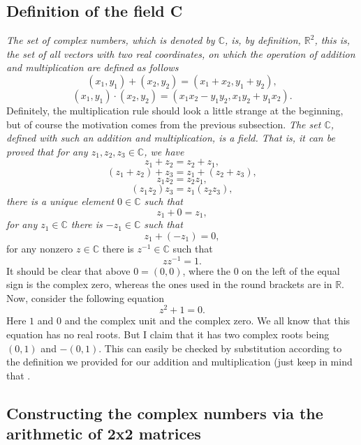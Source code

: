 \documentclass[12pt,oneside,openany]{memoir}
\numberwithin{equation}{subsection}
\begin{document}

\subsection{Definition of the field C}
\textit{The set of complex numbers, which is denoted by $\mathbb{C}$, is, by
definition, $\mathbb{R}^2$, this is, the set of all vectors with two real
coordinates, on which the operation of addition and multiplication are defined
as follows}
\[
	(x_1, y_1) + (x_2, y_2) = (x_1 + x_2, y_1 + y_2),
\]
\[
	(x_1, y_1) \cdot (x_2, y_2) = (x_1 x_2 - y_1 y_2, x_1 y_2 + y_1 x_2).
\]
Definitely, the multiplication rule should look a little strange at the
beginning, but of course the motivation comes from the previous subsection.
\bigbreak\noindent
\textit{The set $\mathbb{C}$, defined with such an addition and multiplication,
is a field. That is, it can be proved that for any
$z_1, z_2, z_3 \in \mathbb{C}$, we have}
\[
	z_1 + z_2 = z_2 + z_1,
\]
\[
	(z_1 + z_2) + z_3 = z_1 + (z_2 + z_3),
\]
\[
	z_1 z_2 = z_2 z_1,
\]
\[
	(z_1 z_2) z_3 = z_1 (z_2 z_3),
\]
\textit{there is a unique element $0 \in \mathbb{C}$ such that}
\[
	z_1 + 0 = z_1,
\]
\textit{for any $z_1 \in \mathbb{C}$ there is $-z_1 \in \mathbb{C}$ such that}
\[
	z_1 + (-z_1) = 0,
\]
for any nonzero $z \in \mathbb{C}$ there is $z^{-1} \in \mathbb{C}$ such that
\[
	z z^{-1} = 1.
\]
It should be clear that above $0 = (0, 0)$, where the $0$ on the left of the
equal sign is the complex zero, whereas the ones used in the round brackets are
in $\mathbb{R}$.
\bigbreak
Now, consider the following equation
\[
	z^2 + 1 = 0.
\]
Here $1$ and $0$ and the complex unit and the complex zero. We all know  that
this equation has  no real roots. But I claim that it has two complex roots
being $(0, 1)$ and $-(0, 1)$. This can easily be checked by substitution
according to the definition we provided for our addition and multiplication
(just keep in mind that .

\subsection{Constructing the complex numbers via the arithmetic of 2x2 matrices}

\end{document}
